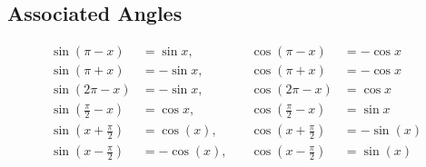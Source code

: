 \documentclass[10pt, a4paper]{report}
\begin{document}
\subsection*{Associated Angles}
\begin{align*}
\sin(\pi - x) &= \sin x, & \cos(\pi - x) &= -\cos x \\
\sin(\pi + x) &= -\sin x,\quad &\cos(\pi + x) &= -\cos x \\
\sin(2\pi - x) &= -\sin x,\quad &\cos(2\pi - x) &= \cos x \\
\sin\left(\frac{\pi}{2}-x\right)&=\cos x,\quad &\cos\left(\frac{\pi}{2}-x\right) &= \sin x\\
\sin\left(x + \frac{\pi}{2}\right) &= \cos(x),\quad &\cos\left(x + \frac{\pi}{2}\right) &= -\sin(x)\\
\sin\left(x - \frac{\pi}{2}\right) &= -\cos(x),\quad &\cos\left(x - \frac{\pi}{2}\right) &= \sin(x)
\end{align*}
\end{document}
